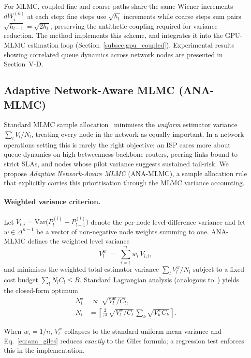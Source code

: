 \documentclass{ieeeaccess}
\begin{document}
For MLMC, coupled fine and coarse paths share the same Wiener increments $dW_i^{(k)}$ at each
step: fine steps use $\sqrt{h_l}$ increments while coarse steps sum pairs
$\sqrt{h_{l-1}} = \sqrt{2h_l}$, preserving the antithetic coupling required for variance
reduction. The  method implements this
scheme, and  integrates it into the GPU-MLMC estimation loop
(Section~\ref{subsec:gpu_coupled}). Experimental results showing correlated queue dynamics across
network nodes are presented in Section~V-D.

\subsection{Adaptive Network-Aware MLMC (ANA-MLMC)}
\label{subsec:ana_mlmc}

Standard MLMC sample allocation~\cite{giles2015multilevel} minimises the \emph{uniform}
estimator variance $\sum_l V_l/N_l$, treating every node in the network as equally important.
In a network operations setting this is rarely the right objective: an ISP cares more about queue
dynamics on high-betweenness backbone routers, peering links bound to strict SLAs, and nodes
whose pilot variance suggests sustained tail-risk. We propose \emph{Adaptive Network-Aware MLMC}
(ANA-MLMC), a sample allocation rule that explicitly carries this prioritisation through the MLMC
variance accounting.

\paragraph{Weighted variance criterion.}
Let $V_{l,i} = \mathrm{Var}\bigl(P_l^{(i)} - P_{l-1}^{(i)}\bigr)$ denote the per-node
level-difference variance and let $w \in \Delta^{n-1}$ be a vector of non-negative node weights
summing to one. ANA-MLMC defines the weighted level variance
\begin{equation}
    V_l^{w} \;=\; \sum_{i=1}^{n} w_i\, V_{l,i},
    \label{eq:ana_var}
\end{equation}
and minimises the weighted total estimator variance $\sum_l V_l^{w}/N_l$ subject to a fixed cost
budget $\sum_l N_l C_l \le B$. Standard Lagrangian analysis (analogous
to~\cite{giles2015multilevel}) yields the closed-form optimum
\begin{align}
    N_l^{\star} &\;\propto\; \sqrt{V_l^{w}/C_l}, \nonumber \\
    N_l &= \left\lceil \tfrac{2}{\varepsilon^{2}}\,
    \sqrt{V_l^{w}/C_l}\, \sum_k \sqrt{V_k^{w} C_k} \right\rceil .
    \label{eq:ana_giles}
\end{align}
\begin{sloppypar}
When $w_i = 1/n$, $V_l^{w}$ collapses to the standard uniform-mean variance and
Eq.~\eqref{eq:ana_giles} reduces \emph{exactly} to the Giles formula; a regression test
enforces this in the implementation.
\end{sloppypar}
\end{document}
